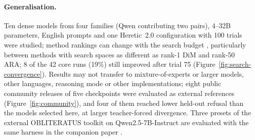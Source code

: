 \paragraph{Generalisation.}
Ten dense models from four families (Qwen contributing two pairs), 4--32B
parameters, English prompts and one Heretic~2.0 configuration with 100 trials
were studied; method rankings can change with the search budget
\cite{dodge2019show}, particularly between methods with search spaces as
different as rank-1 DiM and rank-50 ARA; 8 of the 42 core runs (19\%) still
improved after trial 75 (Figure~\ref{fig:search-convergence}). Results may
not transfer to mixture-of-experts or larger models, other languages,
reasoning mode or other implementations; eight public community releases of
five checkpoints were evaluated as external references
(Figure~\ref{fig:community}), and four of them reached lower held-out refusal
than the models selected here, at larger teacher-forced divergence. Three
presets of the external OBLITERATUS toolkit on Qwen2.5-7B-Instruct are
evaluated with the same harness in the companion paper \cite{young2026paper30}.

